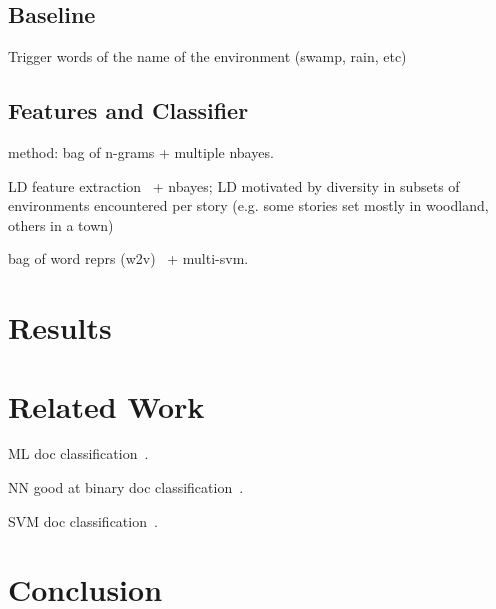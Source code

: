 \documentclass[11pt]{article}
\begin{document}
\subsection{Baseline}
Trigger words of the name of the environment (swamp, rain, etc)

\subsection{Features and Classifier}
method: bag of n-grams + multiple nbayes.

LD feature extraction~\cite{lui2011cross} + nbayes; LD motivated by diversity in subsets of environments encountered per story (e.g. some stories set mostly in woodland, others in a town)

bag of word reprs (w2v)~\cite{mikolov2013efficient} + multi-svm.

\section{Results}

\section{Related Work}


ML doc classification~\cite{sebastiani2002machine}.

NN good at binary doc classification~\cite{derczynski2006machine}.

SVM doc classification~\cite{isa2008text}.

\section{Conclusion}

\iffalse
\section*{Acknowledgments}
This project has received funding from the European Union’s Seventh Framework Programme for research, technological development and demonstration under grant agreement No. 611233, \textsc{Pheme}.
ah, was anything funding this? could anything be associated with this?? ahhh, erm
\fi



\end{document}
